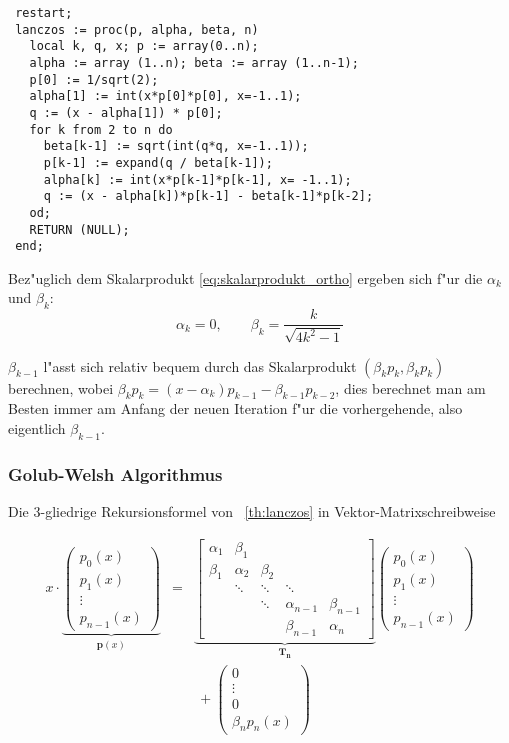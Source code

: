 \documentclass[german, 10pt, a4paper, twocolumn]{scrartcl}
\theoremstyle{definition}
\begin{document}
\small
\begin{verbatim}
 restart;
 lanczos := proc(p, alpha, beta, n)
   local k, q, x; p := array(0..n);
   alpha := array (1..n); beta := array (1..n-1);
   p[0] := 1/sqrt(2);
   alpha[1] := int(x*p[0]*p[0], x=-1..1);
   q := (x - alpha[1]) * p[0];
   for k from 2 to n do
     beta[k-1] := sqrt(int(q*q, x=-1..1));
     p[k-1] := expand(q / beta[k-1]);
     alpha[k] := int(x*p[k-1]*p[k-1], x= -1..1);
     q := (x - alpha[k])*p[k-1] - beta[k-1]*p[k-2];
   od;
   RETURN (NULL);
 end;
\end{verbatim}
\normalsize

Bez"uglich dem Skalarprodukt \ref{eq:skalarprodukt_ortho} ergeben sich f"ur die $\alpha_k$ und $\beta_k$:
\begin{displaymath}
	\alpha_k = 0, \qquad \beta_k = \frac{k}{\sqrt{4k^2 - 1}}
\end{displaymath}

$\beta_{k-1}$ l"asst sich relativ bequem durch das Skalarprodukt $(\beta_k p_k, \beta_k p_k)$ berechnen, wobei $\beta_k p_k = (x-\alpha_k)p_{k-1} - \beta_{k-1}p_{k-2}$, dies berechnet man am Besten immer am Anfang der neuen Iteration f"ur die vorhergehende, also eigentlich $\beta_{k-1}$.


\subsubsection{Golub-Welsh Algorithmus}

Die 3-gliedrige Rekursionsformel von ~\ref{th:lanczos} in Vektor-Matrixschreibweise

\scriptsize
\begin{eqnarray*}
	x \cdotp 
	\underbrace{
	\left (
	\begin{array}{c}
		p_0(x)\\
		p_1(x)\\
		\vdots\\
		p_{n-1}(x)
	\end{array}
	\right )
	}_{\mathbf{p}(x)} &
	= &
	\underbrace{
	\left [
	\begin{array}{cccccc}
		\alpha_1 &	\beta_1\\
		\beta_1 &	\alpha_2 &	\beta_2\\
		&		\ddots &	\ddots &	\ddots \\
		&		&		\ddots &	\alpha_{n-1} &	\beta_{n-1} \\
		&		&		&		\beta_{n-1} &	\alpha_{n}
	\end{array}
	\right ]
	}_{\mathbf{T_n}}
	\left (
	\begin{array}{c}
		p_0(x)\\
		p_1(x)\\
		\vdots\\
		p_{n-1}(x)
	\end{array}
	\right )\\
	& &
	\ +
	\left (
	\begin{array}{c}
		0\\
		\vdots\\
		0\\
		\beta_n p_n(x)
	\end{array}
	\right )
\end{eqnarray*}
\normalsize
\end{document}
